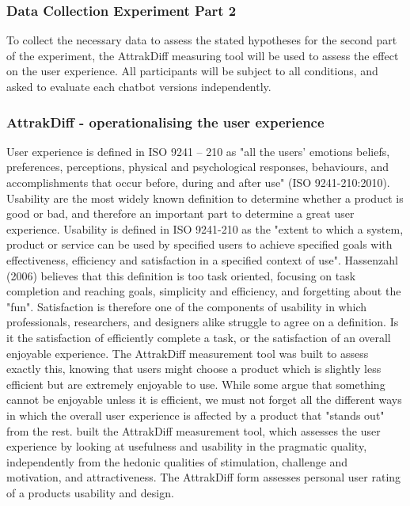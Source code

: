 \subsubsection{Data Collection Experiment Part 2}
To collect the necessary data to assess the stated hypotheses for the second part of the experiment, the AttrakDiff measuring tool will be used to assess the effect on the user experience. All participants will be subject to all conditions, and asked to evaluate each chatbot versions independently.

    \vspace{5mm} %
   
    \subsubsection{AttrakDiff - operationalising the user experience}
    
    User experience is defined in ISO 9241 – 210 as "all the users' emotions beliefs, preferences, perceptions, physical and psychological responses, behaviours, and accomplishments that occur before, during and after use" (ISO 9241-210:2010). Usability are the most widely known definition to determine whether a product is good or bad, and therefore an important part to determine a great user experience. Usability is defined in ISO 9241-210 as the "extent to which a system, product or service can be used by specified users to achieve specified goals with effectiveness, efficiency and satisfaction in a specified context of use". Hassenzahl (2006) believes that this definition is too task oriented, focusing on task completion and reaching goals, simplicity and efficiency, and forgetting about the "fun". Satisfaction is therefore one of the components of usability in which professionals, researchers, and designers alike struggle to agree on a definition. Is it the satisfaction of efficiently complete a task, or the satisfaction of an overall enjoyable experience. The AttrakDiff measurement tool was built to assess exactly this, knowing that users might choose a product which is slightly less efficient but are extremely enjoyable to use. While some argue that something cannot be enjoyable unless it is efficient, we must not forget all the different ways in which the overall user experience is affected by a product that "stands out" from the rest. \cite{Hassenzahl2000} built the AttrakDiff measurement tool, which assesses the user experience by looking at usefulness and usability in the pragmatic quality, independently from the hedonic qualities of stimulation, challenge and motivation, and attractiveness. The AttrakDiff form assesses personal user rating of a products usability and design.
    
